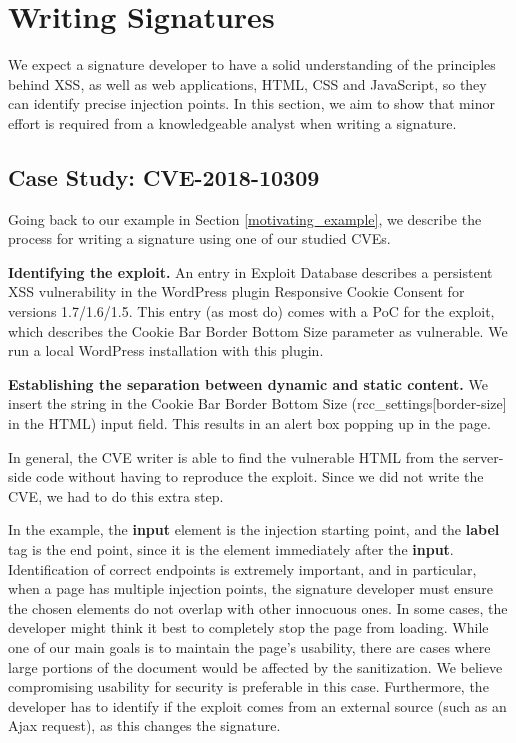 \section{Writing Signatures} \label{signature_writing}

We expect a signature developer to have a solid understanding of the principles behind \ac{XSS}, as well as web applications, HTML, CSS and JavaScript, so they can identify precise injection points. In this section, we aim to show that minor effort is required from a knowledgeable analyst when writing a signature.


\subsection{Case Study: CVE-2018-10309} \label{case_study}
Going back to our example in Section \ref{motivating_example}, we describe the process for writing a signature using one of our studied CVEs.

\textbf{Identifying the exploit.} An entry in Exploit Database
\cite{studyCVE} describes a persistent \ac{XSS} vulnerability in the
WordPress plugin Responsive Cookie Consent for versions
1.7/1.6/1.5. This entry (as most do) comes with a \ac{PoC} for the
exploit, which describes the Cookie Bar Border Bottom Size parameter
as vulnerable. We run a local WordPress installation with this plugin.

\textbf{Establishing the separation between dynamic and static content.} We insert the string  in the Cookie Bar Border Bottom Size (rcc\_settings[border-size] in the HTML) input field. This results in an alert box popping up in the page.

In general, the CVE writer is able to find the vulnerable HTML from the server-side code without having to reproduce the exploit. Since we did not write the CVE, we had to do this extra step.

In the example, the \textbf{input} element is the injection starting point, and the \textbf{label} tag is the end point, since it is the element immediately after the \textbf{input}. Identification of correct endpoints is extremely important, and in particular, when a page has multiple injection points, the signature developer must ensure the chosen elements do not overlap with other innocuous ones. In some cases, the developer might think it best to completely stop the page from loading. While one of our main goals is to maintain the page’s usability, there are cases where large portions of the document would be affected by the sanitization. We believe compromising usability for security is preferable in this case. Furthermore, the developer has to identify if the exploit comes from an external source (such as an Ajax request), as this changes the signature.

